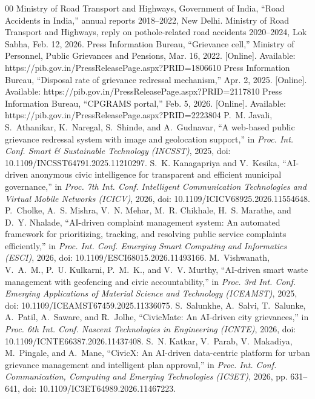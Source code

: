 \documentclass[conference]{IEEEtran}
\begin{document}
\begin{thebibliography}{00}\footnotesize
{} Ministry of Road Transport and Highways, Government of India, ``Road Accidents in India,'' annual reports 2018--2022, New Delhi.
 Ministry of Road Transport and Highways, reply on pothole-related road accidents 2020--2024, Lok Sabha, Feb. 12, 2026.
 Press Information Bureau, ``Grievance cell,'' Ministry of Personnel, Public Grievances and Pensions, Mar. 16, 2022. [Online]. Available: https://pib.gov.in/PressReleasePage.aspx?PRID=1806610
 Press Information Bureau, ``Disposal rate of grievance redressal mechanism,'' Apr. 2, 2025. [Online]. Available: https://pib.gov.in/PressReleasePage.aspx?PRID=2117810
 Press Information Bureau, ``CPGRAMS portal,'' Feb. 5, 2026. [Online]. Available: https://pib.gov.in/PressReleasePage.aspx?PRID=2223804
 P.~M. Javali, S.~Athanikar, K.~Naregal, S.~Shinde, and A.~Gudnavar, ``A web-based public grievance redressal system with image and geolocation support,'' in \textit{Proc. Int. Conf. Smart \& Sustainable Technology (INCSST)}, 2025, doi: 10.1109/INCSST64791.2025.11210297.
 S.~K. Kanagapriya and V.~Kesika, ``AI-driven anonymous civic intelligence for transparent and efficient municipal governance,'' in \textit{Proc. 7th Int. Conf. Intelligent Communication Technologies and Virtual Mobile Networks (ICICV)}, 2026, doi: 10.1109/ICICV68925.2026.11554648.
 P.~Cholke, A.~S. Mishra, V.~N. Mehar, M.~R. Chikhale, H.~S. Marathe, and D.~Y. Nhalade, ``AI-driven complaint management system: An automated framework for prioritizing, tracking, and resolving public service complaints efficiently,'' in \textit{Proc. Int. Conf. Emerging Smart Computing and Informatics (ESCI)}, 2026, doi: 10.1109/ESCI68015.2026.11493166.
 M.~Vishwanath, V.~A.~M., P.~U. Kulkarni, P.~M.~K., and V.~V. Murthy, ``AI-driven smart waste management with geofencing and civic accountability,'' in \textit{Proc. 3rd Int. Conf. Emerging Applications of Material Science and Technology (ICEAMST)}, 2025, doi: 10.1109/ICEAMST67459.2025.11336075.
 S.~Salunkhe, A.~Salvi, T.~Salunke, A.~Patil, A.~Saware, and R.~Jolhe, ``CivicMate: An AI-driven city grievances,'' in \textit{Proc. 6th Int. Conf. Nascent Technologies in Engineering (ICNTE)}, 2026, doi: 10.1109/ICNTE66387.2026.11437408.
 S.~N. Katkar, V.~Parab, V.~Makadiya, M.~Pingale, and A.~Mane, ``CivicX: An AI-driven data-centric platform for urban grievance management and intelligent plan approval,'' in \textit{Proc. Int. Conf. Communication, Computing and Emerging Technologies (IC3ET)}, 2026, pp. 631--641, doi: 10.1109/IC3ET64989.2026.11467223.

\end{thebibliography}
\end{document}

